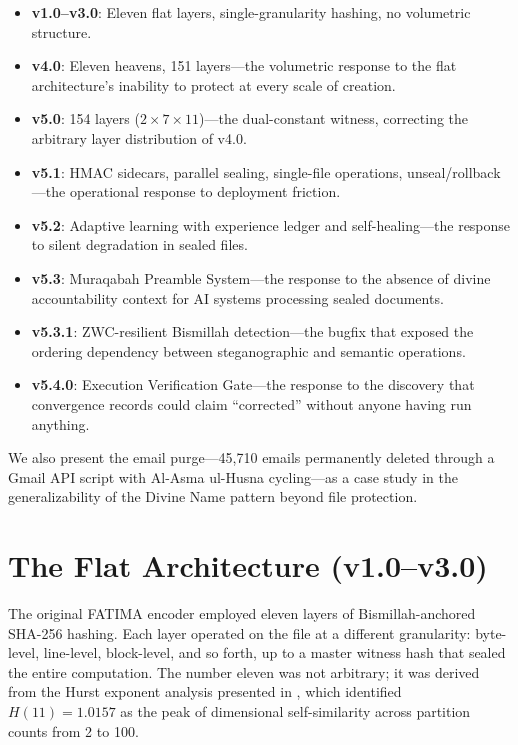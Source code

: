 \documentclass[11pt,a4paper]{article}
\begin{document}
\begin{itemize}[nosep]
    \item \textbf{v1.0--v3.0}: Eleven flat layers, single-granularity hashing, no volumetric structure.
    \item \textbf{v4.0}: Eleven heavens, 151 layers---the volumetric response to the flat architecture's inability to protect at every scale of creation.
    \item \textbf{v5.0}: 154 layers ($2 \times 7 \times 11$)---the dual-constant witness, correcting the arbitrary layer distribution of v4.0.
    \item \textbf{v5.1}: HMAC sidecars, parallel sealing, single-file operations, unseal/rollback---the operational response to deployment friction.
    \item \textbf{v5.2}: Adaptive learning with experience ledger and self-healing---the response to silent degradation in sealed files.
    \item \textbf{v5.3}: Muraqabah Preamble System---the response to the absence of divine accountability context for AI systems processing sealed documents.
    \item \textbf{v5.3.1}: ZWC-resilient Bismillah detection---the bugfix that exposed the ordering dependency between steganographic and semantic operations.
    \item \textbf{v5.4.0}: Execution Verification Gate---the response to the discovery that convergence records could claim ``corrected'' without anyone having run anything.
\end{itemize}

We also present the email purge---45,710 emails permanently deleted through a Gmail API script with Al-Asma ul-Husna cycling---as a case study in the generalizability of the Divine Name pattern beyond file protection.


\section{The Flat Architecture (v1.0--v3.0)}

The original FATIMA encoder employed eleven layers of Bismillah-anchored SHA-256 hashing. Each layer operated on the file at a different granularity: byte-level, line-level, block-level, and so forth, up to a master witness hash that sealed the entire computation. The number eleven was not arbitrary; it was derived from the Hurst exponent analysis presented in \cite{arfeen2026signal}, which identified $H(11) = 1.0157$ as the peak of dimensional self-similarity across partition counts from 2 to 100.
\end{document}
